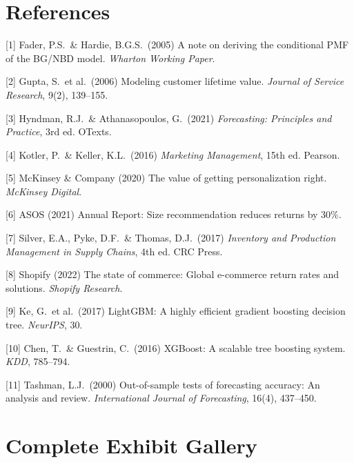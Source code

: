 \documentclass{article}
\begin{document}
\section*{References}
{\small

[1] Fader, P.S.\ \& Hardie, B.G.S.\ (2005) A note on deriving the conditional PMF of the BG/NBD model. \emph{Wharton Working Paper}.

[2] Gupta, S.\ et al.\ (2006) Modeling customer lifetime value. \emph{Journal of Service Research}, 9(2), 139--155.

[3] Hyndman, R.J.\ \& Athanasopoulos, G.\ (2021) \emph{Forecasting: Principles and Practice}, 3rd ed. OTexts.

[4] Kotler, P.\ \& Keller, K.L.\ (2016) \emph{Marketing Management}, 15th ed. Pearson.

[5] McKinsey \& Company (2020) The value of getting personalization right. \emph{McKinsey Digital}.

[6] ASOS (2021) Annual Report: Size recommendation reduces returns by 30\%.

[7] Silver, E.A., Pyke, D.F.\ \& Thomas, D.J.\ (2017) \emph{Inventory and Production Management in Supply Chains}, 4th ed. CRC Press.

[8] Shopify (2022) The state of commerce: Global e-commerce return rates and solutions. \emph{Shopify Research}.

[9] Ke, G.\ et al.\ (2017) LightGBM: A highly efficient gradient boosting decision tree. \emph{NeurIPS}, 30.

[10] Chen, T.\ \& Guestrin, C.\ (2016) XGBoost: A scalable tree boosting system. \emph{KDD}, 785--794.

[11] Tashman, L.J.\ (2000) Out-of-sample tests of forecasting accuracy: An analysis and review. \emph{International Journal of Forecasting}, 16(4), 437--450.
}


\newpage
\appendix
\renewcommand{\thefigure}{A.\arabic{figure}}
\renewcommand{\thetable}{A.\arabic{table}}
\setcounter{figure}{0}
\setcounter{table}{0}

\section{Complete Exhibit Gallery}
\label{app:exhibits}
\end{document}
